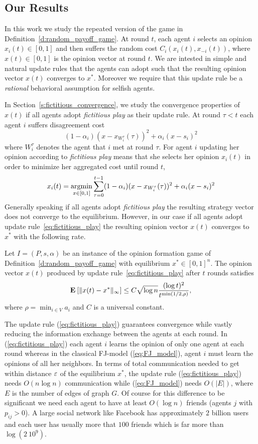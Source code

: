 \subsection{Our Results}

In this work we study the repeated version of the game in Definition~\ref{d:random_payoff_game}. 
At round $t$, each agent $i$ selects an opinion $x_i(t) \in [0,1]$ and then suffers the
random cost $C_i(x_i(t),x_{-i}(t))$, where $x(t) \in [0,1]$ is the opinion vector at round $t$. 
We are intested in simple and natural update rules
that the agents can adopt such that the resulting opinion vector $x(t)$ converges to $x^*$.
Moreover we require that this update rule be a \emph{rational} behavioral assumption for
selfish agents.

In Section~\ref{s:fictitious_convergence}, we study the convergence properties of $x(t)$ if all agents adopt \emph{fictitious play}
as their update rule. At round $\tau < t$ each agent $i$ suffers disagreement cost
\[(1-\alpha_i)(x-x_{W_i^\tau}(\tau))^2+\alpha_i(x-s_i)^2 \]where $W_i^\tau$
denotes the agent that $i$ met at round $\tau$. For agent $i$ updating her opinion according to \emph{fictitious play}
means that she selects her opinion $x_i(t)$ in order to minimize her aggregated cost until round $t$,
\begin{equation}\label{eq:fictitious_play}
x_i(t) =\operatorname*{argmin}_{x \in [0,1]}\sum_{\tau=0}^{t-1}(1-\alpha_i)(x-x_{W_i^\tau}(\tau))^2+\alpha_i(x-s_i)^2
\end{equation}
\noindent Generally speaking if all agents adopt \emph{fictitious play} the resulting
strategy vector does not converge to the equilibrium. However, in our case if all agents adopt update rule~\ref{eq:fictitious_play}
the resulting opinion vector $x(t)$ converges to $x^*$ with the following
rate.
\begin{theorem}\label{t:fictitious_convergence}
  Let $I = (P,s, \alpha)$ be an instance of the opinion formation
  game of Definition~\ref{d:random_payoff_game} with equilibrium
  $x^* \in [0,1]^n$.  The opinion vector $x(t)$ produced by
  update rule~\ref{eq:fictitious_play} after $t$ rounds satisfies
  \[
    \bm{\mathrm{E}}_{} \left[ \| x(t) - x^* \|_{\infty} \right] \leq
    C \sqrt{\log n}\frac{(\log t)^{2}}{t^{\min(1/2,\rho)}},
  \]
  where $\rho = \min_{i \in V} a_i$ and $C$ is a universal constant.
\end{theorem}
The update rule (\ref{eq:fictitious_play}) guarantees convergence
while vastly reducing the information exchange between the agents
at each round. In (\ref{eq:fictitious_play}) each agent $i$ learns the opinion of only one agent
at each round whereas in the classical FJ-model (\ref{eq:FJ_model}), agent $i$ must
learn the opinions of all her neighbors. In terms of
total communication needed to get within distance $\varepsilon$ of the
equilibrium $x^*$, the update rule (\ref{eq:fictitious_play}) needs
$O(n \log n)$ communication while (\ref{eq:FJ_model}) needs
$O(|E|)$, where $E$ is the number of edges of graph $G$.
Of course for this difference to be significant we need
each agent to have at least $O(\log n)$ friends (agents $j$ with $p_{ij}>0$). A large social
network like Facebook has approximately $2$ billion users and each user
has usually more that $100$ friends which is far more than $\log(2\ 10^9)$.

